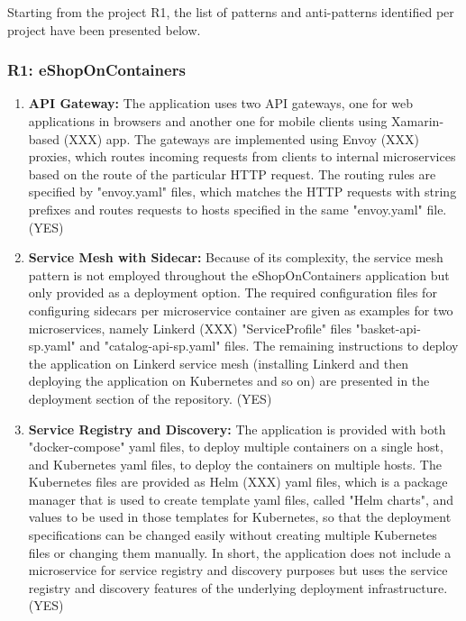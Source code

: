 \documentclass{Configuration_Files/PoliMi3i_thesis}
\begin{document}
Starting from the project R1, the list of patterns and anti-patterns identified per project have been presented below.

\subsubsection{R1: eShopOnContainers}
\label{subsubsec:R1}

\begin{enumerate}
    \item \textbf{API Gateway:} The application uses two API gateways, one for web applications in browsers and another one for mobile clients using Xamarin-based (XXX) app.
    The gateways are implemented using Envoy (XXX) proxies, which routes incoming requests from clients to internal microservices based on the route of the particular HTTP request.
    The routing rules are specified by "envoy.yaml" files, which matches the HTTP requests with string prefixes and routes requests to hosts specified in the same "envoy.yaml" file. (YES)
    
    \item \textbf{Service Mesh with Sidecar:} Because of its complexity, the service mesh pattern is not employed throughout the eShopOnContainers application but only provided as a deployment option.
    The required configuration files for configuring sidecars per microservice container are given as examples for two microservices, namely Linkerd (XXX) "ServiceProfile" files "basket-api-sp.yaml" and "catalog-api-sp.yaml" files.
    The remaining instructions to deploy the application on Linkerd service mesh (installing Linkerd and then deploying the application on Kubernetes and so on) are presented in the deployment section of the repository. (YES)
    
    \item \textbf{Service Registry and Discovery:} The application is provided with both "docker-compose" yaml files, to deploy multiple containers on a single host, and Kubernetes yaml files, to deploy the containers on multiple hosts. 
    The Kubernetes files are provided as Helm (XXX) yaml files, which is a package manager that is used to create template yaml files, called "Helm charts", and values to be used in those templates for Kubernetes, so that the deployment specifications can be changed easily without creating multiple Kubernetes files or changing them manually.
    In short, the application does not include a microservice for service registry and discovery purposes but uses the service registry and discovery features of the underlying deployment infrastructure. (YES)
    

\end{enumerate}
\end{document}
